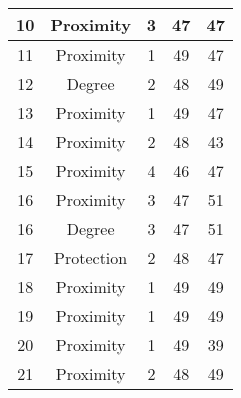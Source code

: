 \documentclass[results.tex]{subfiles}
\begin{document}
\begin{center}
\begin{tabular}{| c || c | c | c | c |}
            \hline
            10                      & Proximity                    & 3                      & 47                      & 47                   \\
            \hline
            11                      & Proximity                    & 1                      & 49                      & 47                   \\
            \hline
            12                      & Degree                       & 2                      & 48                      & 49                   \\
            \hline
            13                      & Proximity                    & 1                      & 49                      & 47                   \\
            \hline
            14                      & Proximity                    & 2                      & 48                      & 43                   \\
            \hline
            15                      & Proximity                    & 4                      & 46                      & 47                   \\
            \hline
            16                      & Proximity                    & 3                      & 47                      & 51                   \\
            \hline
            16                      & Degree                       & 3                      & 47                      & 51                   \\
            \hline
            17                      & Protection                   & 2                      & 48                      & 47                   \\
            \hline
            18                      & Proximity                    & 1                      & 49                      & 49                   \\
            \hline
            19                      & Proximity                    & 1                      & 49                      & 49                   \\
            \hline
            20                      & Proximity                    & 1                      & 49                      & 39                   \\
            \hline
            21                      & Proximity                    & 2                      & 48                      & 49                   \\

\end{tabular}
\end{center}
\end{document}
